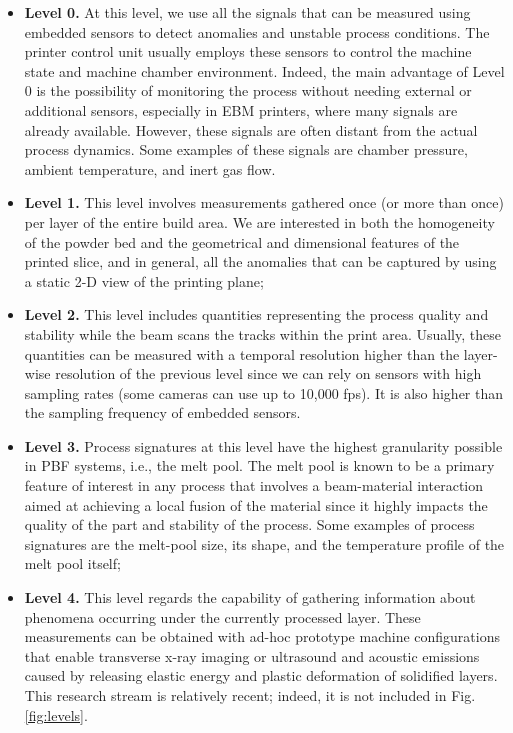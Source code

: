 \begin{itemize}
    \item \textbf{Level 0.} At this level, we use all the signals that can be measured using embedded sensors to detect anomalies and unstable process conditions. The printer control unit usually employs these sensors to control the machine state and machine chamber environment. Indeed, the main advantage of Level 0 is the possibility of monitoring the process without needing external or additional sensors, especially in EBM printers, where many signals are already available. However, these signals are often distant from the actual process dynamics. Some examples of these signals are chamber pressure, ambient temperature, and inert gas flow.
    \item \textbf{Level 1.} This level involves measurements gathered once (or more than once) per layer of the entire build area. We are interested in both the homogeneity of the powder bed and the geometrical and dimensional features of the printed slice, and in general, all the anomalies that can be captured by using a static 2-D view of the printing plane;
    \item \textbf{Level 2.} This level includes quantities representing the process quality and stability while the beam scans the tracks within the print area. Usually, these quantities can be measured with a temporal resolution higher than the layer-wise resolution of the previous level since we can rely on sensors with high sampling rates (some cameras can use up to 10,000 fps). It is also higher than the sampling frequency of embedded sensors.
    \item \textbf{Level 3.} Process signatures at this level have the highest granularity possible in PBF systems, i.e., the melt pool. The melt pool is known to be a primary feature of interest in any process that involves a beam-material interaction aimed at achieving a local fusion of the material since it highly impacts the quality of the part and stability of the process. Some examples of process signatures are the melt-pool size, its shape, and the temperature profile of the melt pool itself;
    \item \textbf{Level 4.} This level regards the capability of gathering information about phenomena occurring under the currently processed layer. These measurements can be obtained with ad-hoc prototype machine configurations that enable transverse x-ray imaging or ultrasound and acoustic emissions caused by releasing elastic energy and plastic deformation of solidified layers. This research stream is relatively recent; indeed, it is not included in Fig. \ref{fig:levels}.
\end{itemize}


